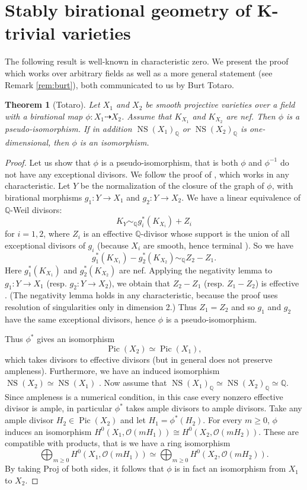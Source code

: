 \documentclass[a4paper,12pt]{amsart}
\def\Q{\mathbb Q}
\def\OO{\mathcal O}
\def\Pic{{\operatorname{Pic}}}
\def\NS{{\operatorname{NS}}}
\theoremstyle{plain}
\newtheorem{theorem}[dummy]{Theorem}
\numberwithin{equation}{section}
\theoremstyle{definition}
\renewcommand{\(}{\left(}
\renewcommand{\)}{\right)}
\newcommand{\dto}{\dashrightarrow}
\begin{document}
\appendix


\section{Stably birational geometry of K-trivial varieties}
\label{app:MRC}
\medskip



The following result is well-known in characteristic zero.
We present the proof 
which works over arbitrary fields as well as a more general statement (see Remark \ref{rem:burt}), both 
communicated to us by Burt Totaro.

\begin{theorem}[Totaro]\label{thm:BurtCY}
\label{pic1}
Let $X_1$ and $X_2$ be 
smooth projective varieties
over a field with a
birational map
$\phi:X_1 \dto X_2$.
Assume that $K_{X_1}$ and $K_{X_2}$ are nef.
Then $\phi$
is a pseudo-isomorphism.
If in addition 
 $\NS(X_1)_\Q$ 
 or $\NS(X_2)_\Q$
 is one-dimensional, then
$\phi$ is an isomorphism.
\end{theorem}

\begin{proof}
Let us show that $\phi$ is a pseudo-isomorphism, that is both
$\phi$
and $\phi^{-1}$ do not have any exceptional divisors.
We follow the proof of \cite[Corollary 3.54]{KollarMori}, which works
in any characteristic. Let $Y$ be the normalization of the closure
of the graph of $\phi$,
with birational morphisms $g_1\colon Y\to X_1$
and $g_2\colon Y\to X_2$. 
We have a linear equivalence of $\Q$-Weil divisors:
$$K_Y \sim_{\Q} g_i^*(K_{X_i})+Z_i$$
for $i=1,2$, where $Z_i$ is an effective $\Q$-divisor
whose support is the union
of all exceptional divisors of $g_i$ (because $X_i$ are smooth, hence terminal \cite[Claim 2.10.4]{KollarSingMMP}). 
So we have
$$g_1^*(K_{X_1})-g_2^*(K_{X_2})\sim_{\Q} Z_2-Z_1.$$
Here $g_1^*(K_{X_1})$ and $g_2^*(K_{X_2})$ are nef.
Applying the negativity lemma to $g_1 : Y \to X_1$
(resp. $g_2 : Y\to X_2$), we obtain that $Z_2-Z_1$
(resp. $Z_1-Z_2$) is effective \cite[Lemma 3.39]{KollarMori}.
(The negativity lemma holds in any characteristic,
because the proof uses resolution
of singularities only in dimension 2.)
Thus $Z_1=Z_2$ and so $g_1$
and $g_2$ have the same exceptional divisors, hence $\phi$ is a pseudo-isomorphism.


Thus $\phi^*$
gives an isomorphism
\[
\Pic(X_2) \simeq \Pic(X_1),
\]
which takes divisors
to effective divisors (but in general does not preserve ampleness).
Furthermore, 
we have
an induced
isomorphism $\NS(X_2) \simeq \NS(X_1)$ \cite[Example 19.1.6]{Fulton}.
Now assume that
$\NS(X_1)_\Q \simeq \NS(X_2)_\Q \simeq \Q$.
Since ampleness is a numerical condition, in this case
every nonzero
effective divisor is ample, in particular
$\phi^*$ 
takes ample divisors to 
ample divisors.
Take any ample
divisor 
$H_2 \in \Pic(X_2)$ 
and let $H_1 = \phi^*(H_2)$.
For 
every $m \ge 0$,
$\phi$ induces 
an isomorphism $H^0(X_1,\OO(mH_1)) \cong H^0(X_2,\OO(mH_2))$.
These are compatible with products,
that is we have a ring isomorphism
\[
\bigoplus_{m\geq 0} H^0(X_1,\OO(mH_1)) \simeq
\bigoplus_{m\geq 0} H^0(X_2,\OO(mH_2)).
\]
By taking Proj of both sides, it follows that $\phi$ is in fact
an isomorphism from $X_1$ to $X_2$.
\end{proof}
\end{document}
